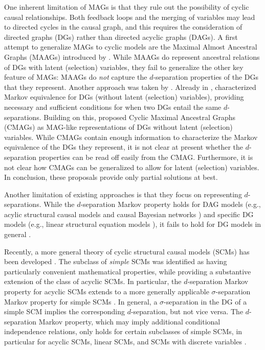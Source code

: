 \documentclass[accepted]{uai2025} %
\begin{document}
One inherent limitation of MAGs is that they rule out the possibility of cyclic causal relationships.
Both feedback loops and the merging of variables may lead to directed cycles in the causal graph, and this requires the consideration of directed graphs (DGs) rather than directed acyclic graphs (DAGs).
A first attempt to generalize MAGs to cyclic models are the Maximal Almost Ancestral Graphs (MAAGs) introduced by \citet{Strobl2015}.
While MAAGs do represent ancestral relations of DGs with latent (selection) variables, they fail to generalize the other key feature of MAGs: MAAGs do \emph{not} capture the $d$-separation properties of the DGs that they represent.
Another approach was taken by \citet{claassen2023establishing}.
Already in \citeyear{richardson1997characterization},
\citeauthor{richardson1997characterization} characterized Markov equivalence for DGs (without latent (selection) variables), providing necessary and sufficient conditions for when two DGs entail the same $d$-separations.
Building on this, \citet{claassen2023establishing} proposed Cyclic Maximal Ancestral Graphs (CMAGs) as MAG-like representations of DGs without latent (selection) variables. 
While CMAGs contain enough information to characterize the Markov equivalence of the DGs they represent, it is not clear at present whether the $d$-separation properties can be read off easily from the CMAG.
Furthermore, it is not clear how CMAGs can be generalized to allow for latent (selection) variables.
In conclusion, these proposals provide only partial solutions at best.

Another limitation of existing approaches is that they focus on representing $d$-separations.
While the $d$-separation Markov property holds for DAG models (e.g., acylic structural causal models and causal Bayesian networks \citep{Lauritzen90}) and specific DG models (e.g., linear structural equation models \citep{Spirtes94,Koster96}), it fails to hold for DG models in general \citep{spirtes95,neal2000}.

Recently, a more general theory of cyclic structural causal models (SCMs) has been developed \citep{BFPM21}. The subclass of \emph{simple} SCMs was identified as having particularly convenient mathematical properties, while providing a substantive extension of the class of acyclic SCMs. In particular, the $d$-separation Markov property for acyclic SCMs extends to a more generally applicable $\sigma$-separation Markov property for simple SCMs \citep{forre2017markov,BFPM21}. 
In general, a $\sigma$-separation in the DG of a simple SCM implies the corresponding $d$-separation, but not vice versa.
The $d$-separation Markov property, which may imply additional conditional independence relations, only holds for certain subclasses of simple SCMs, in particular for acyclic SCMs, linear SCMs, and SCMs with discrete variables \citep{forre2017markov,BFPM21}.
\end{document}
